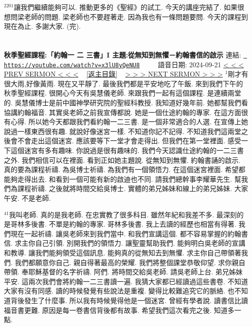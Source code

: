 \documentclass{book}
\begin{document}
$^{2201}$讓我們繼續能夠可以.
推動更多的《聖經》的試工.
今天的講座完結了.
如果很想問梁老師的問題.
梁老師也不要趕著走.
因為我也有一條問題要問.
今天的課程到現在為止.
多謝大家.
(完).
\newpage



\section{}
\label{sec:x3lU8yQeNU8}
\textbf{秋季聖經課程:「約翰一 二 三書」I 主題:從無知到無懼－約翰書信的啟示}
\newline
\newline
連結: \href{https://youtube.com/watch?v=x3lU8yQeNU8}{\texttt{ https://youtube.com/watch?v=x3lU8yQeNU8}} ~~~~ 語音日期: 2024-09-21 
\newline
\newline
\hyperref[sec:A6e_76MEqBA]{\small{< < < PREV SERMON < < <}}
~
\hyperref[sec:index]{\small{[返主目錄]}}
~
\hyperref[sec:sEvrhOW5UYA]{\small{> > > NEXT SERMON > > >}}
\newline
\newline
$^{1}$剛才有很大雨,好像黃雨.
現在又平靜了.
最後我們都是平安地吃了午飯.
來到我們下午的秋季聖經課程.
很開心今天有吳慧儀老師.
來跟我們一起有這個課程.
是連續兩堂的.
吳慧儀博士是前中國神學研究院的聖經科教授.
我知道好幾年前.
她都幫我們看協講約翰福音.
其實吳老師之前我宣傳都說.
她是一個仕途約翰的專家.
在這方面很有心得.
所以她今天都跟我們看約翰一二三書.
是一個非常適合的人選.
在宣傳上她說過一樣東西很有趣.
就說好像迷宮一樣.
不知道你記不記得.
不知道我們這兩堂之後會不會走出這個迷宮.
應該要等下一堂才會走得出.
但我們在第一堂裡面.
感受一下這個迷宮有多有趣味.
你說過是很有趣味的.
我們今天認識仕途約翰的一二三書之外.
我們相信可以在裡面.
看到正如她主題說.
從無知到無懼.
約翰書誦的啟示.
真的要為課程祈禱.
為吳博士祈禱.
為我們有一個領悟力.
在這個迷宮裡面.
希望都能夠走得出去.
和看到一個可能有新的啟迪也不同.
請我們總幹事李耀華先生.
幫我們為課程祈禱.
之後就將時間交給吳博士.
實體的弟兄姊妹和線上的弟兄姊妹.
大家午安.
不是老師.

$^{41}$我叫老師.
真的是我老師.
在忠實教了很多科目.
雖然年紀和我差不多.
最深刻的是哥林多後書.
不單是約翰的專家.
哥林多後書.
我上去讀的經歷也相當有得著.
我們現在一起祈禱.
讓吳老師來到我們當中.
和我們宣講這個.
都不容易掌握的約翰書信.
求主你自己引領.
別開我們的領悟力.
讓聖靈幫助我們.
能夠明白吳老師的宣講和教導.
讓我們能夠領受這個訊息.
能夠真的從無知去到無懼.
求主你自己帶領著我們.
我們都願意你自己.
親自得著最高的榮耀.
我們將整個課堂恭敬仰望.
求你親自帶領.
奉耶穌基督的名字祈禱.
阿們.
將時間交給吳老師.
請吳老師上台.
弟兄姊妹平安.
這兩次我們會將約翰一二三書讀一遍.
我猜大家都已經讀過這些書卷.
不知道大家有沒有同感.
讀的時候發覺有些說法是重複.
變得比較難追究它的脈絡.
也不知道背後發生了什麼事.
所以我有時候覺得他是一個迷宮.
曾經有學者說.
讀書信比讀福音書更難.
原因是每一卷書信背後都有故事.
希望我們這次看完之後.
知道多一點.
\end{document}
